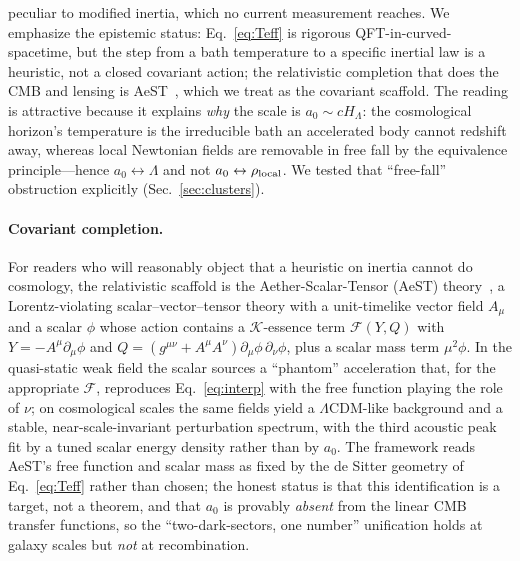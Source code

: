 \documentclass[aps,prd,twocolumn,10pt,nofootinbib,superscriptaddress]{revtex4-2}
\begin{document}
peculiar to modified inertia, which no current measurement reaches. We emphasize the epistemic status:
Eq.~\eqref{eq:Teff} is rigorous QFT-in-curved-spacetime, but the step from a bath temperature to a specific inertial
law is a heuristic, not a closed covariant action; the relativistic completion that does the CMB and lensing is AeST~\cite{Skordis2021},
which we treat as the covariant scaffold. The reading is attractive because it explains \emph{why} the scale is
$a_0\!\sim\!cH_\Lambda$: the cosmological horizon's temperature is the irreducible bath an accelerated body cannot
redshift away, whereas local Newtonian fields are removable in free fall by the equivalence principle---hence
$a_0\leftrightarrow\Lambda$ and not $a_0\leftrightarrow\rho_{\rm local}$. We tested that ``free-fall'' obstruction
explicitly (Sec.~\ref{sec:clusters}).

\paragraph{Covariant completion.} For readers who will reasonably object that a heuristic on inertia cannot do
cosmology, the relativistic scaffold is the Aether-Scalar-Tensor (AeST) theory~\cite{Skordis2021}, a Lorentz-violating
scalar--vector--tensor theory with a unit-timelike vector field $A_\mu$ and a scalar $\phi$ whose action contains a
$\mathcal{K}$-essence term $\mathcal{F}(Y,Q)$ with $Y=-A^\mu\partial_\mu\phi$ and $Q=(g^{\mu\nu}+A^\mu A^\nu)
\partial_\mu\phi\,\partial_\nu\phi$, plus a scalar mass term $\mu^2\phi$. In the quasi-static weak field the scalar
sources a ``phantom'' acceleration that, for the appropriate $\mathcal{F}$, reproduces Eq.~\eqref{eq:interp} with the
free function playing the role of $\nu$; on cosmological scales the same fields yield a $\Lambda$CDM-like background
and a stable, near-scale-invariant perturbation spectrum, with the third acoustic peak fit by a tuned scalar energy
density rather than by $a_0$. The framework reads AeST's free function and scalar mass as fixed by the de
Sitter geometry of Eq.~\eqref{eq:Teff} rather than chosen; the honest status is that this identification is a target,
not a theorem, and that $a_0$ is provably \emph{absent} from the linear CMB transfer functions, so the
``two-dark-sectors, one number'' unification holds at galaxy scales but \emph{not} at recombination.
\end{document}
